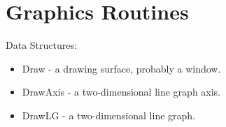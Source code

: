 {\small
\noindent

}

\section{Graphics Routines}

\noindent
Data Structures:
\begin{itemize}
\item Draw - a drawing surface, probably a window.
\item DrawAxis - a two-dimensional line graph axis.
\item DrawLG - a two-dimensional line graph.
\end{itemize}


{\small
\noindent

}

